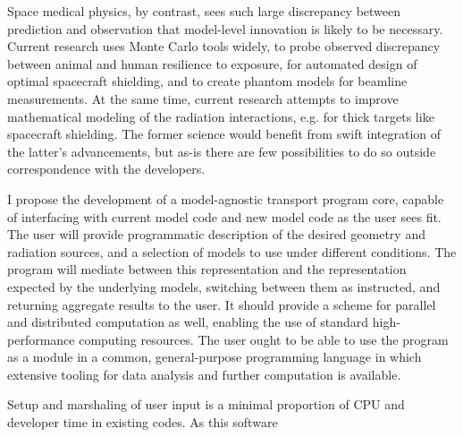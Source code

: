 \documentclass{article}
\begin{document}
Space medical physics, by contrast, sees such large discrepancy between prediction and observation that model-level innovation is likely to be necessary.
Current research uses Monte Carlo tools widely, to probe observed discrepancy between animal and human resilience to exposure,
for automated design of optimal spacecraft shielding, and to create phantom models for beamline measurements. %
At the same time, current research attempts to improve mathematical modeling of the radiation interactions, e.g. for thick targets like spacecraft shielding.
The former science would benefit from swift integration of the latter's advancements,
but as-is there are few possibilities to do so outside correspondence with the developers.

I propose the development of a model-agnostic transport program core, capable of interfacing with current model code and new model code as the user sees fit.
The user will provide programmatic description of the desired geometry and radiation sources, and a selection of models to use under different conditions.
The program will mediate between this representation and the representation expected by the underlying models, switching between them as instructed,
and returning aggregate results to the user.
It should provide a scheme for parallel and distributed computation as well, enabling the use of standard high-performance computing resources.
The user ought to be able to use the program as a module in a common, general-purpose programming language in which extensive tooling for data analysis
and further computation is available.

Setup and marshaling of user input is a minimal proportion of CPU and developer time in existing codes.
As this software
\end{document}
